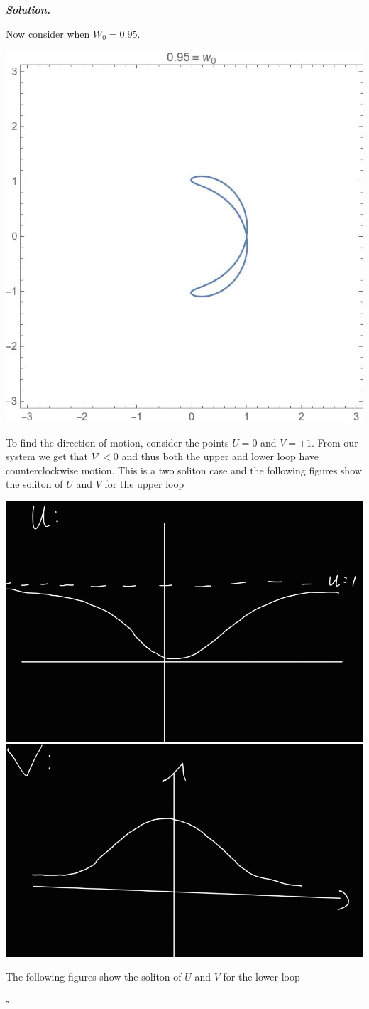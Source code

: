 \documentclass[12pt]{report}
\newenvironment{solution}[1][\it{Solution}]{\textbf{#1. } }{$\square$}
\begin{document}
\begin{solution}
\begin{enumerate}
        \noindent
        Now consider when $W_0 = 0.95$.
        \begin{center}
            \includegraphics[width=.5\linewidth]{plots/1-5.jpg}
        \end{center}
        To find the direction of motion, consider the points $U = 0$ and $V=\pm 1$. From our system we get that $V' < 0$ and thus both the upper and lower loop have counterclockwise motion. This is a two soliton case and the following figures show the soliton of $U$ and $V$ for the upper loop

        \begin{center}
            \includegraphics[width=.4\linewidth]{plots/fig3.jpg}
            \includegraphics[width=.4\linewidth]{plots/fig7.jpg}
        \end{center}

        The following figures show the soliton of $U$ and $V$ for the lower loop


\end{enumerate}
\end{solution}
\end{document}
